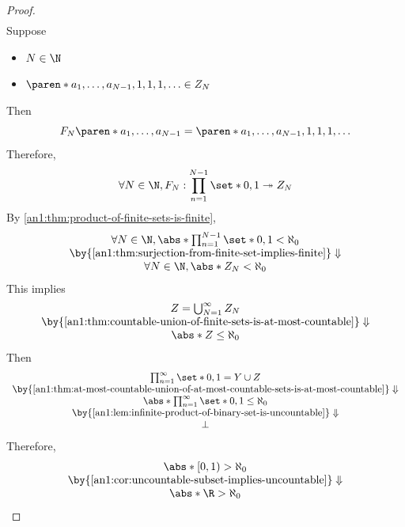 \begin{proof}
\[\begin{gathered}
    \end{gathered}
  \]
  Suppose
  \begin{itemize}
    \item $N \in \N$
    \item $\paren*{a_{1}, \ldots, a_{N - 1}, 1, 1, 1, \ldots} \in Z_{N}$
  \end{itemize}
  Then
  \[
    F_{N}\paren*{a_{1}, \ldots, a_{N - 1}} = \paren*{a_{1}, \ldots, a_{N - 1}, 1, 1, 1, \ldots}
  \]
  Therefore,
  \[
    \forall N \in \N, F_{N}: \prod_{n = 1}^{N - 1} \set*{0, 1} \twoheadrightarrow Z_{N}
  \]
  By \cref{an1:thm:product-of-finite-sets-is-finite},
  \[
    \begin{array}{c}
      \forall N \in \N, \abs*{\prod_{n = 1}^{N - 1} \set*{0, 1}} < \aleph_{0}  \\
      \by{\Cref{an1:thm:surjection-from-finite-set-implies-finite}} \Downarrow \\
      \forall N \in \N, \abs*{Z_{N}} < \aleph_{0}
    \end{array}
  \]
  This implies
  \[
    \begin{array}{c}
      Z = \bigcup_{N = 1}^{\infty} Z_{N}                                                 \\
      \by{\Cref{an1:thm:countable-union-of-finite-sets-is-at-most-countable}} \Downarrow \\
      \abs*{Z} \leq \aleph_{0}
    \end{array}
  \]
  Then
  \[
    \begin{array}{c}
      \prod_{n = 1}^{\infty} \set*{0, 1} = Y \cup Z                                                         \\
      \by{\Cref{an1:thm:at-most-countable-union-of-at-most-countable-sets-is-at-most-countable}} \Downarrow \\
      \abs*{\prod_{n = 1}^{\infty} \set*{0, 1}} \leq \aleph_{0}                                             \\
      \by{\Cref{an1:lem:infinite-product-of-binary-set-is-uncountable}} \Downarrow                          \\
      \bot
    \end{array}
  \]
  Therefore,
  \[
    \begin{array}{c}
      \abs*{[0, 1)} > \aleph_{0}                                            \\
      \by{\Cref{an1:cor:uncountable-subset-implies-uncountable}} \Downarrow \\
      \abs*{\R} > \aleph_{0}
    \end{array}
  \]
\end{proof}

